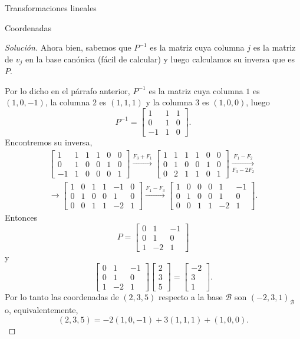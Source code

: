 \documentclass[a4paper,12pt,twoside,spanish,reqno]{amsbook}
\numberwithin{equation}{section}
\theoremstyle{definition}
\theoremstyle{remark}
\begin{document}
\begin{chapter}{Transformaciones lineales}
\begin{section}{Coordenadas}
\begin{proof}[Solución]
    
    Ahora bien, sabemos que $P^{-1}$ es la matriz cuya columna $j$ es la matriz de $v_j$ en la base canónica (fácil de calcular) y luego calculamos su inversa que es $P$.
    
    Por lo dicho en el párrafo anterior, $P^{-1}$  es la matriz cuya  columna $1$ es $(1,0,-1)$,  la columna $2$ es $(1,1,1)$ y la columna $3$ es $(1,0,0)$, luego 
    $$
    P^{-1} = \begin{bmatrix} 1&1&1\\0&1&0\\-1&1&0	\end{bmatrix}.
    $$ 
    Encontremos su inversa,
        \begin{multline*} 
    \left[\begin{array}{rrr|rrr}	1&1&1&1&0&0\\ 0&1&0&0&1&0\\ -1&1&0&0&0&1 \end{array}\right]
    \stackrel{F_3+ F_1}{\longrightarrow}
    \left[\begin{array}{rrr|rrr}	1&1&1&1&0&0\\ 0&1&0&0&1&0\\ 0&2&1&1&0&1 \end{array}\right]
    \underset{F_3-2F_2}{\stackrel{F_1 - F_2}{\longrightarrow}}\\
    \longrightarrow 
    \left[\begin{array}{rrr|rrr}	1&0&1&1&-1&0\\ 0&1&0&0&1&0\\ 0&0&1&1&-2&1 \end{array}\right]
    \stackrel{F_1 - F_3}{\longrightarrow}
    \left[\begin{array}{rrr|rrr}	1&0&0&0&1&-1\\ 0&1&0&0&1&0\\ 0&0&1&1&-2&1 \end{array}\right]
    .
    \end{multline*}
    Entonces 
    $$
    P = \left[\begin{array}{rrr}	0&1&-1\\ 0&1&0\\ 1&-2&1 \end{array}\right]
    $$
    y 
    $$
    \left[\begin{array}{rrr}	0&1&-1\\ 0&1&0\\ 1&-2&1 \end{array}\right]
    \left[\begin{array}{r} 2\\3\\5 \end{array}\right] = 
    \left[\begin{array}{r} -2\\3\\1 \end{array}\right].
    $$
    Por  lo tanto las coordenadas de   $(2,3,5)$ respecto a la base  $\mathcal{B}$ son $(-2,3,1)_{\mathcal B}$ o,  equivalentemente, 
    $$
    (2,3,5) = -2(1,0,-1)+3(1,1,1)+(1,0,0).
    $$
    

\end{proof}
\end{section}
\end{chapter}
\end{document}
